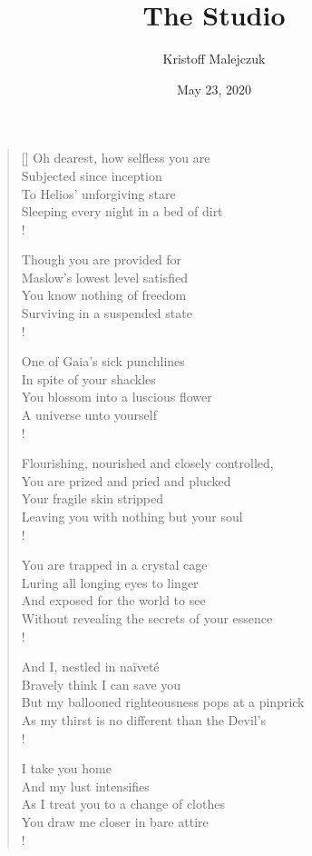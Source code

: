 \documentclass[11pt]{article} %
\title{The Studio}
\author{Kristoff Malejczuk}
\date{May 23, 2020}                                                        %
\begin{document}
\settowidth{\versewidth}{You are pried, plucked from your place}

\begin{verse}[\versewidth]
Oh dearest, how selfless you are \\
Subjected since inception \\
To Helios' unforgiving stare \\
Sleeping every night in a bed of dirt \\!

Though you are provided for \\
Maslow's lowest level satisfied \\
You know nothing of freedom \\
Surviving in a suspended state \\!

One of Gaia's sick punchlines \\
In spite of your shackles \\
You blossom into a luscious flower \\
A universe unto yourself \\!

Flourishing, nourished and closely controlled, \\
You are prized and pried and plucked \\
Your fragile skin stripped \\
Leaving you with nothing but your soul \\!

You are trapped in a crystal cage \\
Luring all longing eyes to linger \\
And exposed for the world to see \\
Without revealing the secrets of your essence \\!

And I, nestled in naïveté \\
Bravely think I can save you \\
But my ballooned righteousness pops at a pinprick \\
As my thirst is no different than the Devil's \\!

I take you home \\
And my lust intensifies \\
As I treat you to a change of clothes \\
You draw me closer in bare attire \\!


\end{verse}
\end{document}
